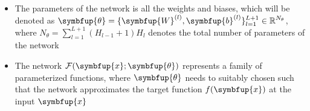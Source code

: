 \documentclass[11pt]{extarticle}
\newcommand{\ds}{\displaystyle}
\newcommand{\vx}{\symbfup{x}}
\newcommand{\vb}{\symbfup{b}}
\newcommand{\vW}{\symbfup{W}}
\theoremstyle{definition}
\newcommand{\btheta}{\symbfup{\theta}}
\newcommand{\Ro}{\mathbb{R}}           	                %
\newtheorem{question}{Question}%
\begin{document}
\begin{itemize}

  \item The parameters of the network is all the weights and biases, which will be denoted as $\ds\btheta = \{\vW^{(l)}, \vb^{(l)} \}_{l=1}^{L+1} \in \Ro^{N_\theta}$, where $\ds N_\theta = \sum_{l=1}^{L+1} (H_{l-1} + 1) H_l$ denotes the total number of parameters of the network 

  \item The network $\mathcal{F}(\vx; \btheta)$ represents a family of parameterized functions, where $\btheta$ needs to suitably chosen such that the network approximates the target function $f(\vx)$ at the input $\vx$

\end{itemize}


\newpage

\end{document}
